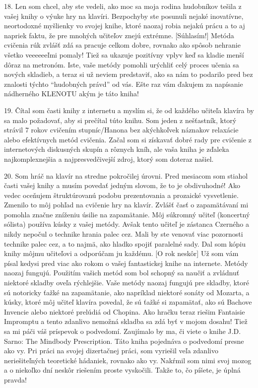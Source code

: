 18. Len som chcel, aby ste vedeli, ako moc sa moja rodina hudobníkov tešila z vašej knihy o výuke hry na klavíri. Bezpochyby ste posunuli nejaké inovatívne, neortodoxné myšlienky vo svojej knihe, ktoré naozaj robia nejakú prácu a to aj napriek faktu, že pre mnohých učiteľov znejú extrémne. [Súhlasím!] Metóda cvičenia rúk zvlášť zdá sa pracuje celkom dobre, rovnako ako spôsob nehranie  všetko veeeeeeľmi pomaly! Tiež sa ukazuje pozitívny vplyv keď sa kladie menší dôraz na metronóm. Iste, vaše metódy pomohli urýchliť celý proces učenia sa nových skladieb, a teraz si už neviem predstaviť, ako sa nám to podarilo pred bez znalosti týchto “hudobných právd” od vás. Ešte raz vám ďakujem za napísanie nádherného KLENOTU akým je táto kniha!
\medskip

19. Čítal som časti knihy z internetu a myslím si, že od každého učiteľa klavíra by sa malo požadovať, aby si prečítal túto knihu. Som jeden z nešťastník, ktorý strávil 7 rokov cvičením stupníc/Hanona bez akýchkoľvek náznakov relaxácie alebo efektívnych metód cvičenia. Začal som si získavať dobré rady pre cvičenie z internetových diskusných skupín a rôznych kníh, ale vaša kniha je zďaleka najkomplexnejšia a najpresvedčivejší zdroj, ktorý som doteraz našiel.
\medskip

20. Som hráč na klavír na stredne pokročilej úrovni. Pred mesiacom som stiahol časti vašej knihy a musím povedať jedným slovom, že to je obdivuhodné! Ako vedec oceňujem štruktúrovanú podobu prezentovania a prozaické vysvetlenie. Zmenilo to môj pohľad na cvičenie hry na klavír. Zvlášť časť o zapamätávaní mi pomohla značne zníženiu úsilie na zapamätanie. Môj súkromný učiteľ (koncertný sólista) používa kúsky z vašej metódy. Avšak tento učiteľ je zástanca Czerného a nikdy nepočul o technike hrania palec cez. Mali by ste venovať viac pozornosti technike palec cez, a to najmä, ako hladko spojiť paralelné sady. Dal som kópiu knihy môjmu učiteľovi a odporúčam ju každému.
[O rok neskôr]
Už som vám písal kedysi pred viac ako rokom o vašej fantastickej knihe na internete. Metódy naozaj fungujú. Použitím vašich metód som bol schopný sa naučiť a zvládnuť niektoré skladby oveľa rýchlejšie. Vaše metódy naozaj fungujú pre skladby, ktoré sú notoricky ťažké na zapamätanie, ako napríklad niektoré sonáty od Mozarta, a kúsky, ktoré môj učiteľ klavíra povedal, že sú ťažké si zapamätať, ako sú Bachove Invencie alebo niektoré prelúdiá od Chopina. Ako hračku teraz riešim Fantaisie Impromptu a tento zdanlivo nemožná skladba sa zdá byť v mojom dosahu! Tiež sa mi páči váš príspevok o podvedomí. Zaujímalo by ma, či viete o knihe J.D. Sarno: The Mindbody Prescription. Táto kniha pojednáva o podvedomí presne ako vy. Pri práci na svojej dizertačnej práci, som vyriešil veľa zdanlivo neriešiteľných teoretické hádaniek, rovnako ako vy. Nakŕmil som nimi svoj mozog a o niekoľko dní neskôr riešením proste vyskočili. Takže to, čo píšete, je úplná pravda!
\medskip

